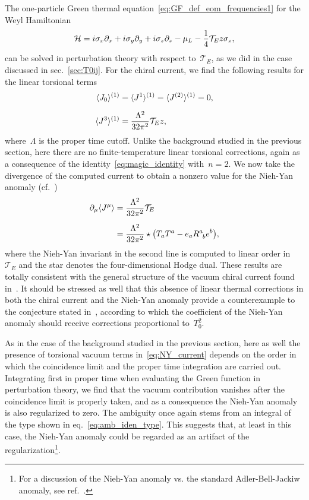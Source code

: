\documentclass[11pt,a4paper]{article}
\begin{document}
The one-particle Green thermal equation~\eqref{eq:GF_def_eom_frequencies1} for the Weyl
Hamiltonian
\begin{align}
\mathcal{H}=i\sigma_{x}\partial_{x}+i\sigma_{y}\partial_{y}+i\sigma_{z}\partial_{z}
-\mu_{L}-{1\over 4}\mathcal{T}_{E}z\sigma_{z},
\label{eq:hamiltonian_NYferm}
\end{align}
can be solved in perturbation theory with respect to~$\mathcal{T}_{E}$, as we did in the case discussed in
sec.~\ref{sec:T0ij}. For the chiral current, we find the following results for the 
linear torsional terms
\begin{align}
\langle J_{0}\rangle^{(1)}&=\langle J^{1}\rangle^{(1)}=\langle J^{(2)}\rangle^{(1)}=0, \nonumber \\[0.2cm]
\langle J^{3}\rangle^{(1)}&={\Lambda^{2}\over 32\pi^{2}}\mathcal{T}_{E}z,
\label{eq:NY_current}
\end{align} 
where~$\Lambda$ is the proper time cutoff. Unlike the background studied in the
previous section, here there are
no finite-temperature linear torsional corrections, again as a consequence of the identity~\eqref{eq:magic_identity} with~$n=2$.
We now take the divergence of the computed current to obtain a nonzero value for the 
Nieh-Yan anomaly (cf.~\cite{Valle:2021nfv})
\begin{align}
\partial_{\mu}\langle J^{\mu}\rangle&={\Lambda^{2}\over 32\pi^{2}}\mathcal{T}_{E}
\nonumber \\[0.2cm]
&={\Lambda^{2}\over 32\pi^{2}}
\star\big(T_{a}T^{a}-e_{a}R^{a}_{\,\,\,b}e^{b}\big),
\label{eq:NY_anomaly_backgrd}
\end{align}
where the Nieh-Yan invariant in the second line
is computed to linear order in~$\mathcal{T}_{E}$ and 
the star denotes the four-dimensional Hodge dual. These results are totally consistent
with the general structure of the vacuum chiral current found in~\cite{Valle:2021nfv}.
It should be stressed as well that 
this absence of linear thermal corrections in both the chiral current and 
the Nieh-Yan anomaly
provide a counterexample to the conjecture stated in~\cite{Nissinen:2019wmh}, according to which 
the coefficient of the Nieh-Yan anomaly
should receive corrections proportional to~$T_{0}^{2}$.

As in the case of the background studied in the 
previous section, here as well the presence of torsional vacuum terms in~\eqref{eq:NY_current} depends
on the order in which the coincidence limit and the proper time integration are carried out. Integrating
first in proper time when evaluating the 
Green function in perturbation theory, we find that the vacuum contribution vanishes after the coincidence limit
is properly taken, and as a consequence the Nieh-Yan anomaly is also regularized to zero. 
The ambiguity once again stems from an integral of the type shown in eq.~\eqref{eq:amb_iden_type}. This suggests that,
at least in this case, the Nieh-Yan anomaly could be regarded as an artifact of the 
regularization\footnote{For a discussion of the Nieh-Yan anomaly vs. the standard 
Adler-Bell-Jackiw anomaly,
see ref.~\cite{Soo:1998ev}.}.
\end{document}
